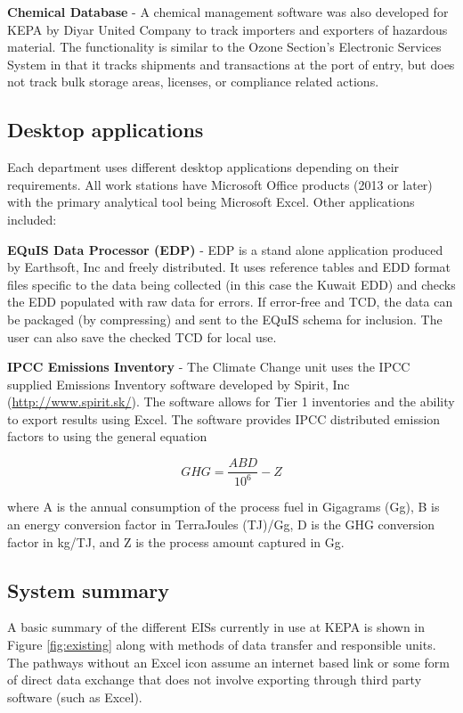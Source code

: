 \textbf{Chemical Database} - A chemical management software was also developed for KEPA by Diyar United Company to track importers and exporters of hazardous material. The functionality is similar to the Ozone Section's Electronic Services System in that it tracks shipments and transactions at the port of entry, but does not track bulk storage areas, licenses, or compliance related actions. 

\subsection{Desktop applications}

Each department uses different desktop applications depending on their requirements. All work stations have Microsoft Office products (2013 or later) with the primary analytical tool being Microsoft Excel. Other applications included:

\textbf{EQuIS Data Processor (EDP)} - EDP is a stand alone application produced by Earthsoft, Inc and freely distributed. It uses reference tables and EDD format files specific to the data being collected (in this case the Kuwait EDD) and checks the EDD populated with raw data for errors. If error-free and TCD, the data can be packaged (by compressing) and sent to the EQuIS schema for inclusion. The user can also save the checked TCD for local use.

\textbf{IPCC Emissions Inventory} - The Climate Change unit uses the IPCC supplied Emissions Inventory software developed by Spirit, Inc (\url{http://www.spirit.sk/}).  The software allows for Tier 1 inventories and the ability to export results using Excel. The software provides IPCC distributed emission factors to using the general equation

\begin{equation}
\label{eq:GHGei}
GHG = \frac{ABD}{10^{6}} - Z
\end{equation}

\noindent
where A is the annual consumption of the process fuel in Gigagrams (Gg), B is an energy conversion factor in TerraJoules (TJ)/Gg, D is the GHG conversion factor in kg/TJ, and Z is the process amount captured in Gg.

\subsection{System summary}
A basic summary of the different EISs currently in use at KEPA is shown in Figure \ref{fig:existing} along with methods of data transfer and responsible units. The pathways without an Excel icon assume an internet based link or some form of direct data exchange that does not involve exporting through third party software (such as Excel).

